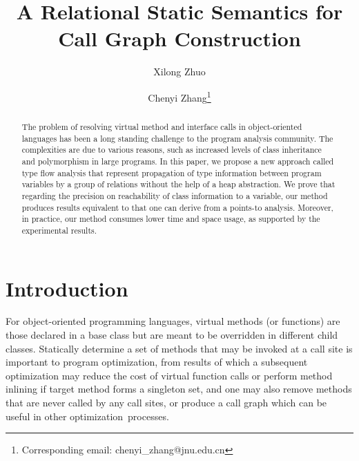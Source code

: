 \documentclass[runningheads]{llncs}
\begin{document}
%
\title{A Relational Static Semantics for \\Call Graph Construction}
%
%
\author{Xilong Zhuo \and Chenyi Zhang\thanks{Corresponding email: chenyi\_zhang@jnu.edu.cn}}
%
%
%
\maketitle              %
%
\begin{abstract}
The problem of resolving virtual method and interface calls in object-oriented languages has been a long standing challenge to the program analysis community. The complexities are due to various reasons, such as increased levels of class inheritance and polymorphism in large programs. In this paper, we propose a new approach called type flow analysis that represent propagation of type information between program variables by a group of relations without the help of a heap abstraction. We prove that regarding the precision on reachability of class information to a variable, our method produces results equivalent to that one can derive from a points-to analysis. Moreover, in practice, our method consumes lower time and space usage, as supported by the experimental results.

\end{abstract}
%
%
%


\section{Introduction}\label{sec:introduction}

For object-oriented programming languages, virtual methods (or functions) are those declared in a base class but are meant to be overridden in different child classes. Statically determine a set of methods that may be invoked at a call site is important to program optimization, from results of which a subsequent optimization may reduce the cost of virtual function calls or perform method inlining if target method forms a singleton set, and one may also remove methods that are never called by any call sites, or produce a call graph which can be useful in other optimization~processes.
\end{document}
